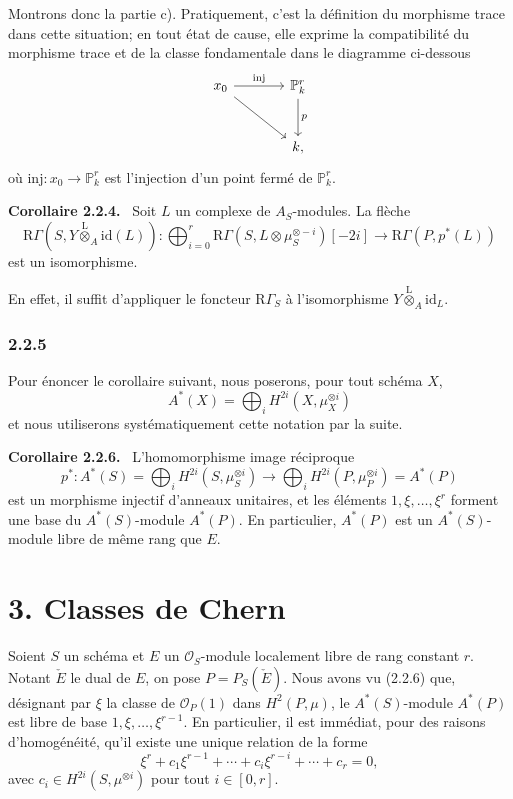 \documentclass[11pt]{article}
\newenvironment{statement}[1]{\par\medskip\noindent\textbf{#1.}\ }{\par\medskip}
\providecommand{\lten}{\overset{\mathrm L}{\otimes}}
\providecommand{\lten}{\overset{\mathrm L}{\otimes}}
\providecommand{\lten}{\overset{\mathrm L}{\otimes}}
\providecommand{\lten}{\overset{\mathrm L}{\otimes}}
\providecommand{\lten}{\overset{\mathrm L}{\otimes}}
\begin{document}
Montrons donc la partie c). Pratiquement, c'est la définition du morphisme trace dans cette situation; en tout état de cause, elle exprime la compatibilité du morphisme trace et de la classe fondamentale dans le diagramme ci-dessous
\[
\begin{tikzcd}[column sep=large,row sep=large]
x_0 \arrow[r,"\mathrm{inj}"] \arrow[dr] & \mathbb P^r_k \arrow[d,"p"]\\
& k ,
\end{tikzcd}
\]
où $\mathrm{inj}:x_0\to \mathbb P^r_k$ est l'injection d'un point fermé de $\mathbb P^r_k$.

\begin{statement}{Corollaire 2.2.4}
Soit $L$ un complexe de $A_S$-modules. La flèche
\[
\mathrm R\Gamma(S,Y\lten_A\mathrm{id}(L)):
\bigoplus_{i=0}^r \mathrm R\Gamma(S,L\otimes\mu_S^{\otimes -i})[-2i]
\longrightarrow
\mathrm R\Gamma(P,p^*(L))
\]
est un isomorphisme.
\end{statement}

En effet, il suffit d'appliquer le foncteur $\mathrm R\Gamma_S$ à l'isomorphisme $Y\lten_A\mathrm{id}_L$.

\subsubsection*{2.2.5}
Pour énoncer le corollaire suivant, nous poserons, pour tout schéma $X$,
\[
A^*(X)=\bigoplus_i H^{2i}(X,\mu_X^{\otimes i})
\]
et nous utiliserons systématiquement cette notation par la suite.

\begin{statement}{Corollaire 2.2.6}
L'homomorphisme image réciproque
\[
p^*:A^*(S)=\bigoplus_i H^{2i}(S,\mu_S^{\otimes i})
\longrightarrow
\bigoplus_i H^{2i}(P,\mu_P^{\otimes i})=A^*(P)
\]
est un morphisme injectif d'anneaux unitaires, et les éléments $1,\xi,\ldots,\xi^r$ forment une base du $A^*(S)$-module $A^*(P)$. En particulier, $A^*(P)$ est un $A^*(S)$-module libre de même rang que $E$.
\end{statement}

\section*{3. Classes de Chern}

Soient $S$ un schéma et $E$ un $\mathcal O_S$-module localement libre de rang constant $r$. Notant $\check E$ le dual de $E$, on pose $P=P_S(\check E)$. Nous avons vu (2.2.6) que, désignant par $\xi$ la classe de $\mathcal O_P(1)$ dans $H^2(P,\mu)$, le $A^*(S)$-module $A^*(P)$ est libre de base $1,\xi,\ldots,\xi^{r-1}$. En particulier, il est immédiat, pour des raisons d'homogénéité, qu'il existe une unique relation de la forme
\[
\xi^r+c_1\xi^{r-1}+\cdots+c_i\xi^{r-i}+\cdots+c_r=0,
\tag{3.1}
\]
avec $c_i\in H^{2i}(S,\mu^{\otimes i})$ pour tout $i\in[0,r]$.
\end{document}
